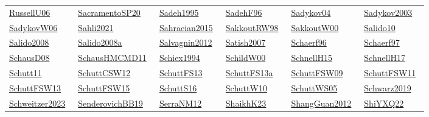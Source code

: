 \begin{longtable}{*{6}{l}}
\href{../works/RussellU06.pdf}{RussellU06}~\cite{RussellU06} & \href{../works/SacramentoSP20.pdf}{SacramentoSP20}~\cite{SacramentoSP20} & \href{../}{Sadeh1995}~\cite{Sadeh1995} & \href{../works/SadehF96.pdf}{SadehF96}~\cite{SadehF96} & \href{../works/Sadykov04.pdf}{Sadykov04}~\cite{Sadykov04} & \href{../}{Sadykov2003}~\cite{Sadykov2003}\\ 
\href{../works/SadykovW06.pdf}{SadykovW06}~\cite{SadykovW06} & \href{../}{Sahli2021}~\cite{Sahli2021} & \href{../}{Sahraeian2015}~\cite{Sahraeian2015} & \href{../}{SakkoutRW98}~\cite{SakkoutRW98} & \href{../works/SakkoutW00.pdf}{SakkoutW00}~\cite{SakkoutW00} & \href{../works/Salido10.pdf}{Salido10}~\cite{Salido10}\\ 
\href{../}{Salido2008}~\cite{Salido2008} & \href{../}{Salido2008a}~\cite{Salido2008a} & \href{../}{Salvagnin2012}~\cite{Salvagnin2012} & \href{../}{Satish2007}~\cite{Satish2007} & \href{../}{Schaerf96}~\cite{Schaerf96} & \href{../works/Schaerf97.pdf}{Schaerf97}~\cite{Schaerf97}\\ 
\href{../works/SchausD08.pdf}{SchausD08}~\cite{SchausD08} & \href{../works/SchausHMCMD11.pdf}{SchausHMCMD11}~\cite{SchausHMCMD11} & \href{../}{Schiex1994}~\cite{Schiex1994} & \href{../works/SchildW00.pdf}{SchildW00}~\cite{SchildW00} & \href{../works/SchnellH15.pdf}{SchnellH15}~\cite{SchnellH15} & \href{../works/SchnellH17.pdf}{SchnellH17}~\cite{SchnellH17}\\ 
\href{../works/Schutt11.pdf}{Schutt11}~\cite{Schutt11} & \href{../works/SchuttCSW12.pdf}{SchuttCSW12}~\cite{SchuttCSW12} & \href{../works/SchuttFS13.pdf}{SchuttFS13}~\cite{SchuttFS13} & \href{../works/SchuttFS13a.pdf}{SchuttFS13a}~\cite{SchuttFS13a} & \href{../works/SchuttFSW09.pdf}{SchuttFSW09}~\cite{SchuttFSW09} & \href{../works/SchuttFSW11.pdf}{SchuttFSW11}~\cite{SchuttFSW11}\\ 
\href{../works/SchuttFSW13.pdf}{SchuttFSW13}~\cite{SchuttFSW13} & \href{../}{SchuttFSW15}~\cite{SchuttFSW15} & \href{../works/SchuttS16.pdf}{SchuttS16}~\cite{SchuttS16} & \href{../works/SchuttW10.pdf}{SchuttW10}~\cite{SchuttW10} & \href{../works/SchuttWS05.pdf}{SchuttWS05}~\cite{SchuttWS05} & \href{../}{Schwarz2019}~\cite{Schwarz2019}\\ 
\href{../}{Schweitzer2023}~\cite{Schweitzer2023} & \href{../works/SenderovichBB19.pdf}{SenderovichBB19}~\cite{SenderovichBB19} & \href{../works/SerraNM12.pdf}{SerraNM12}~\cite{SerraNM12} & \href{../works/ShaikhK23.pdf}{ShaikhK23}~\cite{ShaikhK23} & \href{../}{ShangGuan2012}~\cite{ShangGuan2012} & \href{../}{ShiYXQ22}~\cite{ShiYXQ22}\\ 

\end{longtable}
